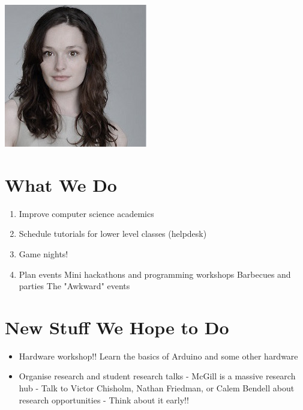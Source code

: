 \begin{center}
	 	\includegraphics[width=.35\textheight]{gfx/genevievethumb.jpg}
	\end{center}


\clearpage

\section{What We Do}

\begin{enumerate}
	\item Improve computer science academics
	\item Schedule tutorials for lower level classes (helpdesk)
	\item Game nights!
	\item Plan events
		\subitem Mini hackathons and programming workshops
		\subitem Barbecues and parties
		\subitem The "Awkward" events
\end{enumerate}

\clearpage

\section{New Stuff We Hope to Do}

\begin{itemize}
	\item Hardware workshop!!  Learn the basics of Arduino and some other hardware
	\item Organise research and student research talks
			\subitem - McGill is a massive research hub
			\subitem - Talk to Victor Chisholm, Nathan Friedman, \newline \space \hspace*{2.5em} or Calem Bendell about research opportunities
			\subitem - Think about it early!!
\end{itemize}

\clearpage

